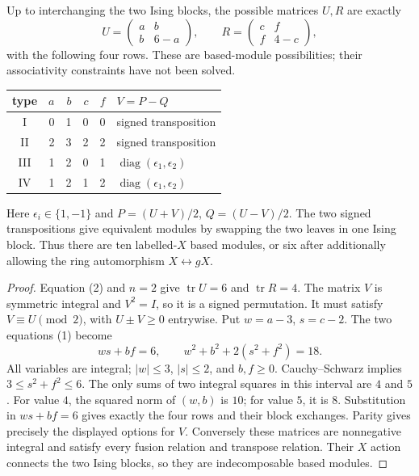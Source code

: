 \begin{theorem}
Up to interchanging the two Ising blocks, the possible matrices $U,R$
are exactly
\[
U=\begin{pmatrix}a&b\\b&6-a\end{pmatrix},\qquad
R=\begin{pmatrix}c&f\\f&4-c\end{pmatrix},
\]
with the following four rows. These are based-module possibilities;
their associativity constraints have not been solved.
\begin{center}
\begin{tabular}{c|rrrr|l}
type&$a$&$b$&$c$&$f$&$V=P-Q$\\\hline
I&0&1&0&0&signed transposition\\
II&2&3&2&2&signed transposition\\
III&1&2&0&1&$\operatorname{diag}(\epsilon_1,\epsilon_2)$\\
IV&1&2&1&2&$\operatorname{diag}(\epsilon_1,\epsilon_2)$
\end{tabular}
\end{center}
Here $\epsilon_i\in\{1,-1\}$ and $P=(U+V)/2$, $Q=(U-V)/2$.
The two signed transpositions give equivalent modules by swapping the
two leaves in one Ising block. Thus there are ten labelled-$X$ based
modules, or six after additionally allowing the ring automorphism
$X\leftrightarrow gX$.
\end{theorem}
\begin{proof}
Equation (2) and $n=2$ give $\operatorname{tr}U=6$ and
$\operatorname{tr}R=4$. The matrix $V$ is symmetric integral and
$V^2=I$, so it is a signed permutation. It must satisfy
$V\equiv U\pmod2$, with $U\pm V\geq0$ entrywise.
Put $w=a-3$, $s=c-2$. The two equations (1) become
\[
ws+bf=6,\qquad w^2+b^2+2(s^2+f^2)=18. \tag{3}
\]
All variables are integral; $|w|\leq3$, $|s|\leq2$, and $b,f\geq0$.
Cauchy--Schwarz implies $3\leq s^2+f^2\leq6$.
The only sums of two integral squares in this interval are $4$ and $5$.
For value $4$, the squared norm of $(w,b)$ is $10$; for value $5$, it
is $8$. Substitution in $ws+bf=6$ gives exactly the four rows and their
block exchanges. Parity gives precisely the displayed options for $V$.
Conversely these matrices are nonnegative integral and satisfy every
fusion relation and transpose relation. Their $X$ action connects the
two Ising blocks, so they are indecomposable based modules.
\end{proof}

